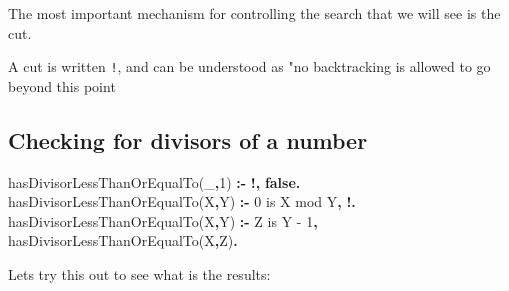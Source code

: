 \documentclass[11pt]{article}
\newenvironment{Shaded}{}{}
\newcommand{\KeywordTok}[1]{\textcolor[rgb]{0.00,0.44,0.13}{\textbf{{#1}}}}
\newcommand{\DataTypeTok}[1]{\textcolor[rgb]{0.56,0.13,0.00}{{#1}}}
\newcommand{\DecValTok}[1]{\textcolor[rgb]{0.25,0.63,0.44}{{#1}}}
\newcommand{\NormalTok}[1]{{#1}}
\begin{document}
The most important mechanism for controlling the search that we will see
is the cut.

A cut is written \texttt{!}, and can be understood as "no backtracking
is allowed to go beyond this point

\hypertarget{checking-for-divisors-of-a-number}{%
\subsection{Checking for divisors of a
number}\label{checking-for-divisors-of-a-number}}

\begin{Shaded}
\begin{Highlighting}[]
\NormalTok{hasDivisorLessThanOrEqualTo(}\DataTypeTok{\_}\KeywordTok{,}\DecValTok{1}\NormalTok{) }\KeywordTok{:{-}} \KeywordTok{!,} \KeywordTok{false.}
\NormalTok{hasDivisorLessThanOrEqualTo(}\DataTypeTok{X}\KeywordTok{,}\DataTypeTok{Y}\NormalTok{) }\KeywordTok{:{-}} \DecValTok{0} \DataTypeTok{is} \DataTypeTok{X} \DecValTok{mod} \DataTypeTok{Y}\KeywordTok{,} \KeywordTok{!.}
\NormalTok{hasDivisorLessThanOrEqualTo(}\DataTypeTok{X}\KeywordTok{,}\DataTypeTok{Y}\NormalTok{) }\KeywordTok{:{-}} \DataTypeTok{Z} \DataTypeTok{is} \DataTypeTok{Y} \DataTypeTok{{-}} \DecValTok{1}\KeywordTok{,}\NormalTok{ hasDivisorLessThanOrEqualTo(}\DataTypeTok{X}\KeywordTok{,}\DataTypeTok{Z}\NormalTok{)}\KeywordTok{.}
\end{Highlighting}
\end{Shaded}

Lets try this out to see what is the results:

\begin{verbatim}
\end{verbatim}


    
    
    
\end{document}
